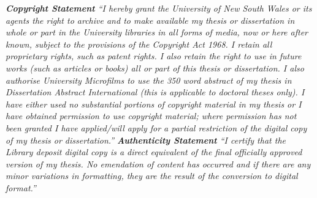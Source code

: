 \begin{center}
\begin{minipage}{0.6\textwidth}
\bigskip
\bigskip
\bigskip
\bigskip
\bigskip
\bigskip
  \textit{
    \textbf{Copyright Statement}
    \smallskip
``I hereby grant the University of New South Wales or its agents the right to archive and to make available my thesis or dissertation in whole or part in the University libraries in all forms of media, now or here after known, subject to the provisions of the Copyright Act 1968. I retain all proprietary rights, such as patent rights. I also retain the right to use in future works (such as articles or books) all or part of this thesis or dissertation.
I also authorise University Microfilms to use the 350 word abstract of my thesis in Dissertation Abstract International (this is applicable to doctoral theses only).
I have either used no substantial portions of copyright material in my thesis or I have obtained permission to use copyright material; where permission has not been granted I have applied/will apply for a partial restriction of the digital copy of my thesis or dissertation.''
  }
\bigskip
  \textit{
    \textbf{Authenticity Statement}
    \smallskip
    ``I certify that the Library deposit digital copy is a direct equivalent of the final officially approved version of my thesis. No emendation of content has occurred and if there are any minor variations in formatting, they are the result of the conversion to digital format.''
  }
\end{minipage}
\end{center}
